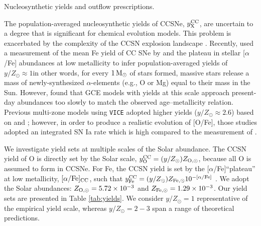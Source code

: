 \documentclass[twocolumn,twocolappendix,linenumbers]{aastex631}
\newcommand{\aFe}{[$\alpha$/Fe]\xspace}
\newcommand{\mathaFe}{[\alpha/{\rm Fe}]}
\newcommand{\yZ}[1]{$y/Z_\odot=#1$}
\newcommand{\Msun}{\,{\rm M}_\odot}
\begin{document}
\begin{table}
    \centering
    \caption{Nucleosynthetic yields and outflow prescriptions.}
    
    \label{tab:yields}
\end{table}

The population-averaged nucleosynthetic yields of CCSNe, $y_{\rm X}^{\rm CC}$, are uncertain to a degree that is significant for chemical evolution models. This problem is exacerbated by the complexity of the CCSN explosion landscape \citep{sukhbold_core-collapse_2016}. Recently, \citet{weinberg_scale_2024} used a measurement of the mean Fe yield of CC SNe by \citet{rodriguez_iron_2023} and the plateau in stellar \aFe abundances at low metallicity to infer population-averaged yields of $y/Z_\odot\approx1$\textemdash in other words, for every $1\Msun$ of stars formed, massive stars release a mass of newly-synthesized $\alpha$-elements (e.g., O or Mg) equal to their mass in the Sun. However, \citet{johnson_milky_2024} found that GCE models with yields at this scale approach present-day abundances too slowly to match the observed age--metallicity relation. Previous multi-zone models using {\tt VICE} \citep[e.g.,][]{johnson_stellar_2021,dubay_galactic_2024} adopted higher yields ($y/Z_\odot\approx2.6$) based on \citet{chieffi_explosive_2004} and \citet{limongi_nucleosynthesis_2006}; however, in order to produce a realistic evolution of [O/Fe], those studies adopted an integrated SN Ia rate which is high compared to the measurement of \citet{maoz_star_2017}.

We investigate yield sets at multiple scales of the Solar abundance. The CCSN yield of O is directly set by the Solar scale, $y_{\rm O}^{\rm CC}=(y/Z_\odot)Z_{\rm O,\odot}$, because all O is assumed to form in CCSNe. For Fe, the CCSN yield is set by the \aFe ``plateau'' at low metallicity, $\mathaFe_{\rm CC}$, such that $y_{\rm Fe}^{\rm CC}=(y/Z_\odot) Z_{\rm Fe,\odot} 10^{-\mathaFe}$ \citep[for further discussion on the empirical yield scale and the CCSN plateau, see][]{weinberg_scale_2024}. We adopt the \citet{asplund_chemical_2009} Solar abundances: $Z_{\rm O,\odot}=5.72\times10^{-3}$ and $Z_{\rm Fe,\odot}=1.29\times10^{-3}$. Our yield sets are presented in Table \ref{tab:yields}. We consider \yZ{1} representative of the empirical yield scale, whereas \yZ{2-3} span a range of theoretical predictions.
\end{document}
